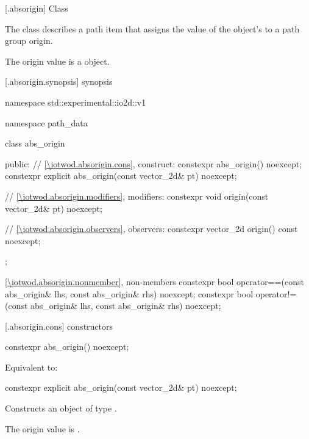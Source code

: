  [\iotwod.absorigin] {Class }

\pnum
{}%
The class  describes a path item that assigns the value of the  object's  to a path group origin.

\pnum
The origin value is a  object.

 [\iotwod.absorigin.synopsis] { synopsis}

\begin{codeblock}
namespace std::experimental::io2d::v1 {
  namespace path_data {
    class abs_origin {
    public:
      // \ref{\iotwod.absorigin.cons}, construct:
      constexpr abs_origin() noexcept;
      constexpr explicit abs_origin(const vector_2d& pt) noexcept;

      // \ref{\iotwod.absorigin.modifiers}, modifiers:
      constexpr void origin(const vector_2d& pt) noexcept;

      // \ref{\iotwod.absorigin.observers}, observers:
      constexpr vector_2d origin() const noexcept;
    };
    
    \ref{\iotwod.absorigin.nonmember}, non-members
    constexpr bool operator==(const abs_origin& lhs,
      const abs_origin& rhs) noexcept;
    constexpr bool operator!=(const abs_origin& lhs,
      const abs_origin& rhs) noexcept;
  }
}
\end{codeblock}

 [\iotwod.absorigin.cons] { constructors}

%
\begin{itemdecl}
constexpr abs_origin() noexcept;
\end{itemdecl}
\begin{itemdescr}
\pnum
\effects
Equivalent to: 
\end{itemdescr}

%
\begin{itemdecl}
constexpr explicit abs_origin(const vector_2d& pt) noexcept;
\end{itemdecl}
\begin{itemdescr}
\pnum
\effects
Constructs an object of type .

\pnum
The origin value is .
\end{itemdescr}

